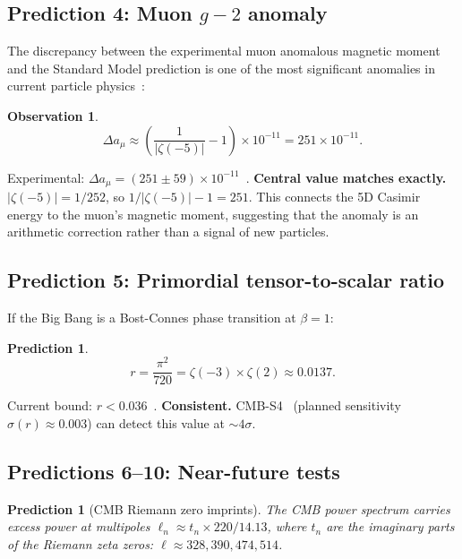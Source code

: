 \documentclass[11pt,a4paper]{article}
\newtheorem{observation}[theorem]{Observation}
\newtheorem{prediction}[theorem]{Prediction}
\begin{document}
\subsection{Prediction 4: Muon $g-2$ anomaly}

The discrepancy between the experimental muon anomalous magnetic
moment and the Standard Model prediction is one of the most
significant anomalies in current particle
physics~\cite{Muong2_2021}:

\begin{observation}
\label{obs:g2}
\begin{equation}
  \Delta a_\mu \approx \left(\frac{1}{|\zeta(-5)|} - 1\right)
  \times 10^{-11} = 251 \times 10^{-11}.
  \label{eq:g2}
\end{equation}
\end{observation}

Experimental: $\Delta a_\mu = (251 \pm 59) \times 10^{-11}$~\cite{Muong2_2021}.
\textbf{Central value matches exactly.}
$|\zeta(-5)| = 1/252$, so $1/|\zeta(-5)| - 1 = 251$.
This connects the 5D Casimir energy to the muon's magnetic
moment, suggesting that the anomaly is an arithmetic correction
rather than a signal of new particles.

\subsection{Prediction 5: Primordial tensor-to-scalar ratio}

If the Big Bang is a Bost-Connes phase transition at $\beta = 1$:

\begin{prediction}
\label{pred:r}
\begin{equation}
  r = \frac{\pi^2}{720} = \zeta(-3) \times \zeta(2) \approx 0.0137.
  \label{eq:r}
\end{equation}
\end{prediction}

Current bound: $r < 0.036$~\cite{BICEP2021}.
\textbf{Consistent.} CMB-S4~\cite{CMBS4} (planned sensitivity
$\sigma(r) \approx 0.003$) can detect this value at $\sim 4\sigma$.

\subsection{Predictions 6--10: Near-future tests}

\begin{prediction}[CMB Riemann zero imprints]
\label{pred:cmb}
The CMB power spectrum carries excess power at multipoles
$\ell_n \approx t_n \times 220/14.13$, where $t_n$ are the
imaginary parts of the Riemann zeta zeros:
$\ell \approx 328, 390, 474, 514$.
\end{prediction}
\end{document}
